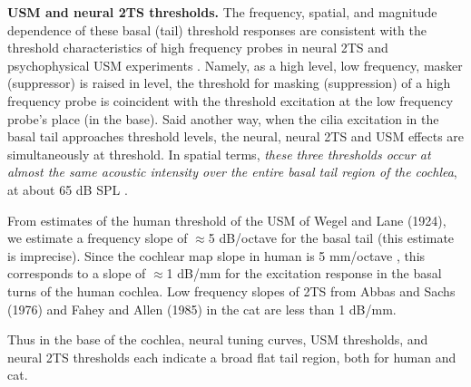 \documentclass{ws-p8-50x6-00}
\newcommand{\paragraph}[1]{{\bf #1}}
\begin{document}
\paragraph{USM and neural 2TS thresholds.}
The frequency, spatial, and magnitude dependence of these
basal (tail) threshold responses are consistent with the threshold
characteristics of high frequency probes in neural 2TS
\cite{Delgutte90,Abbas76,Fahey85,Sen99a}
and psychophysical USM experiments \cite{Wegel24}.
Namely, as a high level, low frequency, masker (suppressor) is raised in level,
the threshold for masking (suppression) of a high frequency probe is coincident with
the threshold excitation at the low frequency probe's place (in the base). Said another
way, when the cilia excitation in the basal tail approaches threshold levels,
the neural, neural 2TS and USM effects are simultaneously at threshold.
In spatial terms, \emph{these three thresholds occur at almost the same acoustic
intensity over the entire basal tail region of the cochlea}, at about 65
dB SPL \cite{Fahey85}.

From estimates of the human threshold of the USM of Wegel and Lane (1924),
\nocite{Wegel24} we estimate a frequency slope of \(\approx\)5 dB/octave for the
basal tail (this estimate is imprecise).  Since the cochlear map slope in human is
5 mm/octave \cite{Greenwood90}, this corresponds to a slope of
\(\approx\)1 dB/mm for the excitation response in the basal turns of
the human cochlea. Low frequency slopes of 2TS from Abbas and Sachs
(1976) and Fahey and Allen (1985) in the cat are less than 1 dB/mm.
\nocite{Abbas76,Fahey85}

Thus in the base of the cochlea, neural tuning curves, USM thresholds,
and neural 2TS thresholds each indicate a broad flat tail region, both for human
and cat.

\end{document}
